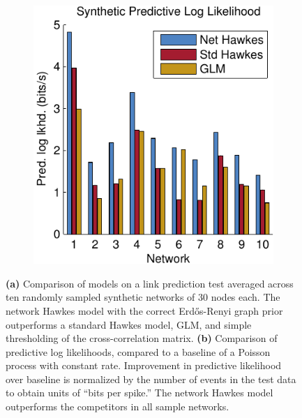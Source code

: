 \begin{figure}[t]
\begin{center}
\begin{subfigure}[T]{.4\textwidth}
    \includegraphics[width=\textwidth]{figures/ch2/synth_pred_ll}
    \label{fig:synth_pred_ll}
  \end{subfigure}
  \end{center}
  \vspace{-1em}
  \caption[Synthetic link prediction and predictive log likelihood]{
    \textbf{(a)} Comparison of models on a link prediction test
    averaged across ten randomly sampled synthetic networks of 30
    nodes each. The network Hawkes model with the correct
    Erd\H{o}s-Renyi graph prior outperforms a standard Hawkes model,
    GLM, and simple thresholding of the cross-correlation matrix.
    \textbf{(b)} Comparison of predictive log likelihoods, compared to
    a baseline of a Poisson process with constant rate. Improvement in
    predictive likelihood over baseline is normalized by the number of
    events in the test data to obtain units of ``bits per spike.'' The
    network Hawkes model outperforms the competitors in all sample
    networks.}
\end{figure}

